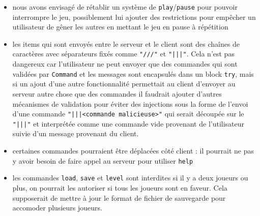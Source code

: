 \documentclass[a4paper,french]{article}
\newcommand{\ttt}[1]{\texttt{#1}}
\begin{document}
\begin{itemize}
    \item nous avons envisag\'e de r\'etablir un syst\`eme de \ttt{play}/\ttt{pause} pour pouvoir interrompre le jeu,
        possiblement lui ajouter des restrictions pour emp\^echer un utilisateur de g\^ener les autres en mettant le
        jeu en pause \`a r\'ep\'etition
    \item les items qui sont envoy\'es entre le serveur et le client sont des cha\^ines de caract\`eres avec s\'eparateurs
        fix\'es comme \ttt{"///"} et \ttt{"|||"}. Cela n'est pas dangereux car l'utilisateur ne peut envoyer
        que des commandes qui sont valid\'ees par \ttt{Command} et les messages sont encapsul\'es dans un block \ttt{try},
        mais si un ajout d'une autre fonctionnalit\'e permettait au client d'envoyer au serveur autre chose que des commandes
        il faudrait ajouter d'autres m\'ecanismes de validation pour \'eviter des injections sous la forme de l'envoi
        d'une commande \ttt{"|||<commande malicieuse>"} qui serait d\'ecoup\'ee sur le \ttt{"|||"} et interpr\'et\'ee
        comme une commande vide provenant de l'utilisateur suivie d'un message provenant du client.
    \item certaines commandes pourraient \^etre d\'eplac\'ees c\^ot\'e client : il pourrait ne pas y avoir besoin de faire
        appel au serveur pour utiliser \ttt{help}
    \item les commandes \ttt{load}, \ttt{save} et \ttt{level} sont interdites si il y a deux joueurs ou plus, on pourrait les
        autoriser si tous les joueurs sont en faveur. Cela supposerait de mettre \`a jour le format de fichier de sauvegarde 
        pour accomoder plusieurs joueurs.
\end{itemize}
\end{document}
